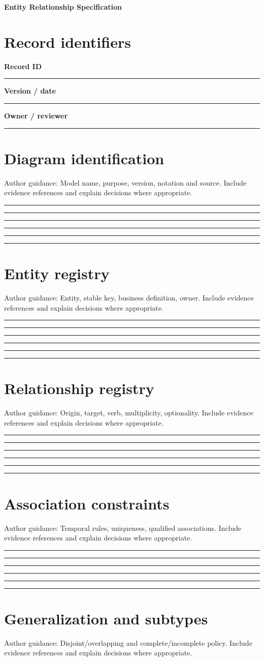 \documentclass[11pt,letterpaper]{article}
\newcommand{\ResponseLine}{\par\vspace{1.05em}\noindent\rule{\linewidth}{0.4pt}\par}
\newcommand{\ResponseArea}{\ResponseLine\ResponseLine\ResponseLine}
\begin{document}
\begin{center}
{\LARGE\bfseries\color{navy} Entity Relationship Specification}\par
\vspace{0.25em}{\large Authoring Template | guided fields}\par
{}
\end{center}
\vspace{0.8em}
\section{Record identifiers}
\textbf{Record ID}\ResponseLine\textbf{Version / date}\ResponseLine\textbf{Owner / reviewer}\ResponseLine
\section{Diagram identification}
Author guidance: Model name, purpose, version, notation and source. Include evidence references and explain decisions where appropriate.


\ResponseArea\ResponseArea
\section{Entity registry}
Author guidance: Entity, stable key, business definition, owner. Include evidence references and explain decisions where appropriate.


\ResponseArea\ResponseArea
\section{Relationship registry}
Author guidance: Origin, target, verb, multiplicity, optionality. Include evidence references and explain decisions where appropriate.


\ResponseArea\ResponseArea
\section{Association constraints}
Author guidance: Temporal rules, uniqueness, qualified associations. Include evidence references and explain decisions where appropriate.


\ResponseArea\ResponseArea
\section{Generalization and subtypes}
Author guidance: Disjoint/overlapping and complete/incomplete policy. Include evidence references and explain decisions where appropriate.
\end{document}
